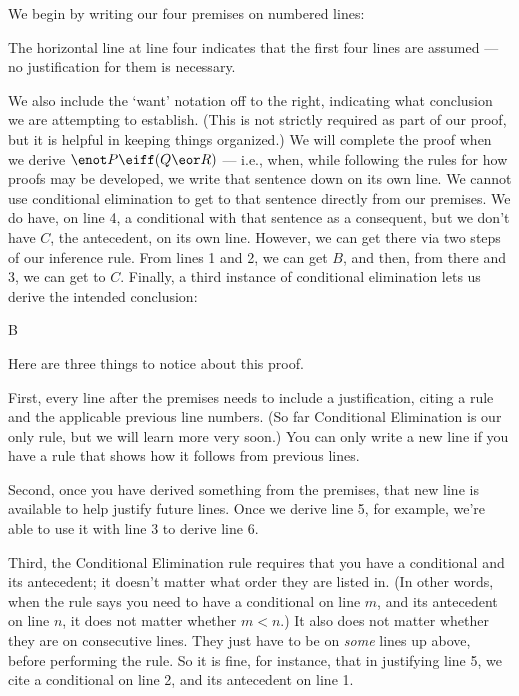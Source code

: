 We begin by writing our four premises on numbered lines:

\begin{ndproof}
	 
\end{ndproof}

The horizontal line at line four indicates that the first four lines are assumed --- no justification for them is necessary.

We also include the `want' notation off to the right, indicating what conclusion we are attempting to establish. (This is not strictly required as part of our proof, but it is helpful in keeping things organized.) We will complete the proof when we derive $\enot P \eiff (Q \eor R)$ --- i.e., when, while following the rules for how proofs may be developed, we write that sentence down on its own line. We cannot use conditional elimination to get to that sentence directly from our premises. We do have, on line 4, a conditional with that sentence as a consequent, but we don't have $C$, the antecedent, on its own line. However, we can get there via two steps of our inference rule. From lines 1 and 2, we can get $B$, and then, from there and 3, we can get to $C$. Finally, a third instance of conditional elimination lets us derive the intended conclusion:

\begin{ndproof}
	 
	 {B} 
	 
	 
\end{ndproof}

Here are three things to notice about this proof.

First, every line after the premises needs to include a justification, citing a rule and the applicable previous line numbers. (So far Conditional Elimination is our only rule, but we will learn more very soon.) You can only write a new line if you have a rule that shows how it follows from previous lines.

Second, once you have derived something from the premises, that new line is available to help justify future lines. Once we derive line 5, for example, we're able to use it with line 3 to derive line 6.

Third, the Conditional Elimination rule requires that you have a conditional and its antecedent; it doesn't matter what order they are listed in. (In other words, when the rule says you need to have a conditional on line $m$, and its antecedent on line $n$, it does not matter whether $m<n$.) It also does not matter whether they are on consecutive lines. They just have to be on \emph{some} lines up above, before performing the rule.  So it is fine, for instance, that in justifying line 5, we cite a conditional on line 2, and its antecedent on line 1.

